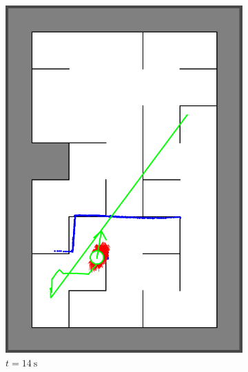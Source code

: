 \begin{figure}[H]
\begin{subfigure}{0.2\textwidth}
         \includegraphics[width=\textwidth]{figures/localization2_14s.png}
         \caption{$t = \SI{14}{\second}$}
         \label{mapping20s}
     \end{subfigure}\\
     \begin{subfigure}{0.2\textwidth}
         \centering

\end{subfigure}
\end{figure}
